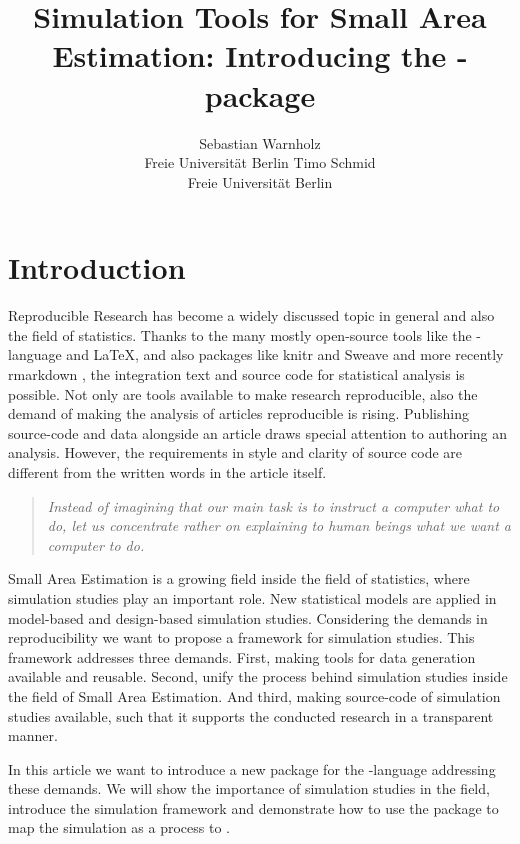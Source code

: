 \documentclass[article]{ajs}
\author{Sebastian Warnholz\\ Freie Universit\"at Berlin \And 
        Timo Schmid \\ Freie Universit\"at Berlin}
\title{Simulation Tools for Small Area Estimation: Introducing the \proglang{R}-package \proglang{saeSim}}
\begin{document}
%
%
%
\section{Introduction}
Reproducible Research has become a widely discussed topic in general and also the field of statistics. Thanks to the many mostly open-source tools like the -language \citep{r14} and \LaTeX, and also packages like knitr \citep{yihui13} and Sweave \citep{leisch02} and more recently rmarkdown \citep{allaire14}, the integration text and source code for statistical analysis is possible. Not only are tools available to make research reproducible, also the demand of making the analysis of articles reproducible is rising. Publishing source-code and data alongside an article draws special attention to authoring an analysis. However, the requirements in style and clarity of source code are different from the written words in the article itself. 

\begin{quote}
\textit{Instead of imagining that our main task is to instruct a computer what to do, let us concentrate rather on explaining to human beings what we want a computer to do.} \cite[p.99]{knuth92} 
\end{quote}

Small Area Estimation is a growing field inside the field of statistics, where simulation studies play an important role. New statistical models are applied in model-based and design-based simulation studies. Considering the demands in reproducibility we want to propose a framework for simulation studies. This framework addresses three demands. First, making tools for data generation available and reusable. Second, unify the process behind simulation studies inside the field of Small Area Estimation. And third, making source-code of simulation studies available, such that it supports the conducted research in a transparent manner.

In this article we want to introduce a new package for the -language addressing these demands. We will show the importance of simulation studies in the field, introduce the simulation framework and demonstrate how to use the package to map the simulation as a process to .
\end{document}
